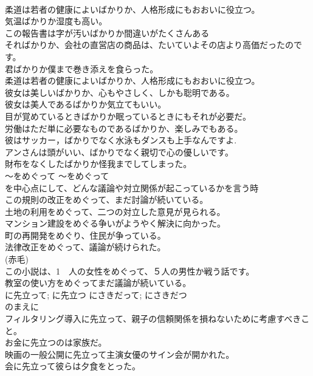 \documentclass[8pt]{extreport}
\begin{document}
\begin{CJK}{UTF8}{min}
\\	柔道は若者の健康によいばかりか、人格形成にもおおいに役立つ。  
\\	気温ばかりか湿度も高い。  
\\	この報告書は字が汚いばかりか間違いがたくさんある  
\\	そればかりか、会社の直営店の商品は、たいていよその店より高価だったのです。   
\\	君ばかりか僕まで巻き添えを食らった。   
\\	柔道は若者の健康によいばかりか、人格形成にもおおいに役立つ。   
\\	彼女は美しいばかりか、心もやさしく、しかも聡明である。   
\\	彼女は美人であるばかりか気立てもいい。   
\\	目が覚めているときばかりか眠っているときにもそれが必要だ。   
\\	労働はただ単に必要なものであるばかりか、楽しみでもある。   
\\	彼はサッカー，ばかりでなく水泳もダンスも上手なんですよ.  
\\	アンさんは頭がいい、ばかりでなく親切で心の優しいです。  
\\	財布をなくしたばかりか怪我までしてしまった。  
\\	〜をめぐって	〜をめぐって	
\\	[〜] を中心点にして、どんな議論や対立関係が起こっているかを言う時	
\\	この規則の改正をめぐって、まだ討論が続いている。   
\\	土地の利用をめぐって、二つの対立した意見が見られる。   
\\	マンション建設をめぐる争いがようやく解決に向かった。  
\\	町の再開発をめぐり、住民が争っている。  
\\	法律改正をめぐって、議論が続けられた。  
\\	(赤毛)
\\	この小説は、1　人の女性をめぐって、５人の男性か戦う話です。  
\\	教室の使い方をめぐってまだ議論が続いている。  
\\	に先立って; に先立つ	にさきだって; にさきだつ	
\\	のまえに	
\\	フィルタリング導入に先立って、親子の信頼関係を損ねないために考慮すべきこと。  
\\	お金に先立つのは家族だ。   
\\	映画の一般公開に先立って主演女優のサイン会が開かれた。  
\\	会に先立って彼らは夕食をとった。   

\end{CJK}
\end{document}

